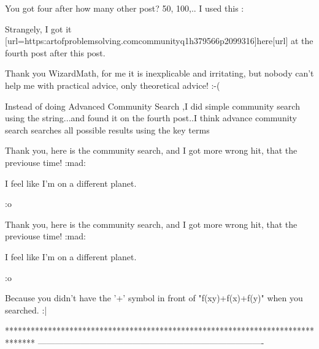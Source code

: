 \begin{solution}
	You got four after how many other post? 50, 100,..
I used this :
\end{solution}



\begin{solution}
	Strangely, I got it [url=https:\/\/artofproblemsolving.com\/community\/q1h379566p2099316]here[\/url] at the fourth post after this post. 
\end{solution}



\begin{solution}
	\begin{bolded}Thank you WizardMath, for me it is inexplicable and irritating, but nobody can't help me with practical advice, only theoretical advice! :-(\end{bolded}
\end{solution}



\begin{solution}
	Instead of doing Advanced Community Search ,I did simple community search using the string...and found it on the fourth post..I think advance community search searches all possible results using the key terms
\end{solution}



\begin{solution}
	Thank you, here is the community search, and I got more wrong hit, that the previouse time!  :mad: 
\begin{bolded}I feel like I'm on a different planet.\end{bolded} :o
\end{solution}



\begin{solution}
	\begin{tcolorbox}Thank you, here is the community search, and I got more wrong hit, that the previouse time!  :mad: 
\begin{bolded}I feel like I'm on a different planet.\end{bolded} :o\end{tcolorbox}

Because you didn't have the '+' symbol in front of "f(xy)+f(x)+f(y)" when you searched. :|
\end{solution}
*******************************************************************************
-------------------------------------------------------------------------------


